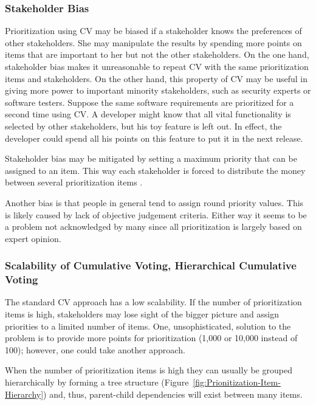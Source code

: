 \subsubsection{Stakeholder Bias\label{sub:Stakeholder-Bias}}

Prioritization using CV may be biased if a stakeholder knows the preferences
of other stakeholders. She may manipulate the results by spending more
points on items that are important to her but not the other stakeholders.
On the one hand, stakeholder bias makes it unreasonable to repeat CV
with the same prioritization items and stakeholders. On the other hand,
this property of CV may be useful in giving more power to important
minority stakeholders, such as security experts or software testers.
Suppose the same software requirements are prioritized for a second time using
CV. A developer might know that all vital functionality is selected by
other stakeholders, but his toy feature is left out. In effect, the developer
could spend all his points on this feature to put it in the next release. 

Stakeholder bias may be mitigated by setting a maximum priority that
can be assigned to an item. This way each stakeholder is forced to
distribute the money between several prioritization items \citep{Berander2006a}.

Another bias is that people in general tend to assign round priority
values. This is likely caused by lack of objective judgement criteria. Either
way it seems to be a problem not acknowledged by many since all prioritization is largely
based on expert opinion.


\subsubsection{Scalability of Cumulative Voting, Hierarchical Cumulative Voting\label{hcv}}

The standard CV approach has a low scalability. If the number of prioritization items
is high, stakeholders may lose sight of the bigger picture and assign priorities to a
limited number of items. One, unsophisticated, solution to the problem is to provide
more points for prioritization (1,000 or 10,000 instead of 100); however, one could take another approach. 

When the number of prioritization items is high they can usually 
be grouped hierarchically by forming a tree structure (Figure~\ref{fig:Prionitization-Item-Hierarchy}) and, thus, parent-child dependencies will exist between many items.

